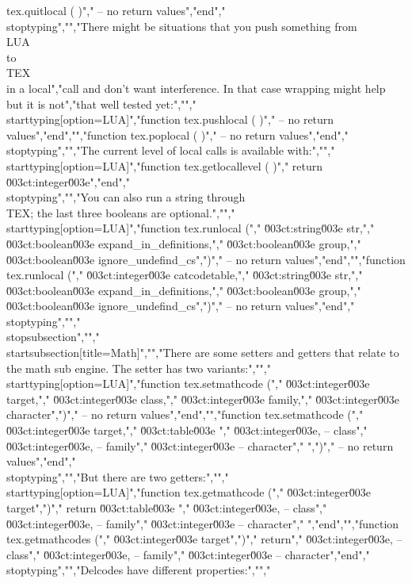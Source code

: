 tex.quitlocal ( )","    -- no return values","end","\\stoptyping","","There might be situations that you push something from \\LUA\\ to \\TEX\\ in a local","call and don't want interference. In that case wrapping might help but it is not","that well tested yet:","","\\starttyping[option=LUA]","function tex.pushlocal ( )","    -- no return values","end","","function tex.poplocal  ( )","    -- no return values","end","\\stoptyping","","The current level of local calls is available with:","","\\starttyping[option=LUA]","function tex.getlocallevel ( )","    return \u003ct:integer\u003e","end","\\stoptyping","","You can also run a string through \\TEX; the last three booleans are optional.","","\\starttyping[option=LUA]","function tex.runlocal (","    \u003ct:string\u003e  str,","    \u003ct:boolean\u003e expand_in_definitions,","    \u003ct:boolean\u003e group,","    \u003ct:boolean\u003e ignore_undefind_cs",")","    -- no return values","end","","function tex.runlocal (","    \u003ct:integer\u003e catcodetable,","    \u003ct:string\u003e  str,","    \u003ct:boolean\u003e expand_in_definitions,","    \u003ct:boolean\u003e group,","    \u003ct:boolean\u003e ignore_undefind_cs",")","    -- no return values","end","\\stoptyping","","\\stopsubsection","","\\startsubsection[title=Math]","","There are some setters and getters that relate to the math sub engine. The setter has two variants:","","\\starttyping[option=LUA]","function tex.setmathcode (","    \u003ct:integer\u003e target,","    \u003ct:integer\u003e class,","    \u003ct:integer\u003e family,","    \u003ct:integer\u003e character",")","    -- no return values","end","","function tex.setmathcode (","    \u003ct:integer\u003e target,","    \u003ct:table\u003e   {","        \u003ct:integer\u003e, -- class","        \u003ct:integer\u003e, -- family","        \u003ct:integer\u003e  -- character","    }",")","    -- no return values","end","\\stoptyping","","But there are two getters:","","\\starttyping[option=LUA]","function tex.getmathcode (","    \u003ct:integer\u003e target",")","    return \u003ct:table\u003e {","        \u003ct:integer\u003e, -- class","        \u003ct:integer\u003e, -- family","        \u003ct:integer\u003e  -- character","    }","end","","function tex.getmathcodes (","    \u003ct:integer\u003e target",")","    return","        \u003ct:integer\u003e, -- class","        \u003ct:integer\u003e, -- family","        \u003ct:integer\u003e  -- character","end","\\stoptyping","","Delcodes have different properties:","","%